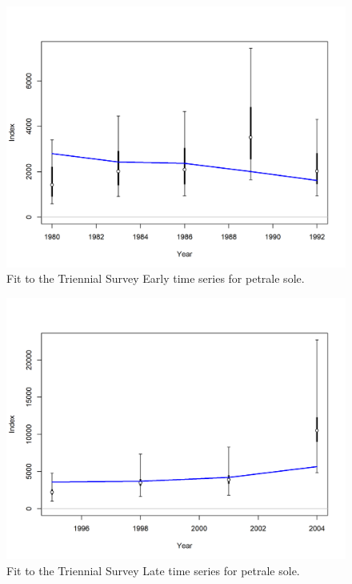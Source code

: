 \documentclass[12pt,]{article}
\begin{document}
\FloatBarrier

\begin{figure}
\centering
\includegraphics{r4ss/plots_mod1/index2_cpuefit_Triennial - Early.png}
\caption{Fit to the Triennial Survey Early time series for petrale sole.
\label{fig:fit_tri_early}}
\end{figure}

\FloatBarrier 

\begin{figure}
\centering
\includegraphics{r4ss/plots_mod1/index2_cpuefit_Triennial - Late.png}
\caption{Fit to the Triennial Survey Late time series for petrale sole.
\label{fig:fit_tri_late}}
\end{figure}
\end{document}
